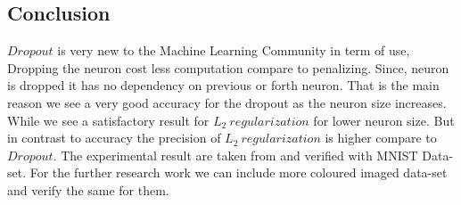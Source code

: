 \documentclass{article}
\begin{document}
\begin{multicols}{2}
\section{Conclusion}

$Dropout$ is very new to the Machine Learning Community in term of use, Dropping the neuron cost less computation compare to penalizing. Since, neuron is dropped it has no dependency on previous or forth neuron. That is the main reason we see a very good accuracy for the dropout as the neuron size increases. While we see a satisfactory result for $L_2 \ regularization$ for lower neuron size. But in contrast to accuracy the precision of $L_2 \ regularization$ is higher compare to $Dropout$. The experimental result are taken from \cite{7877209} and verified with MNIST Data-set. For the further research work we can include more coloured imaged data-set and verify the same for them.

\end{multicols}


\printbibliography
\end{document}
